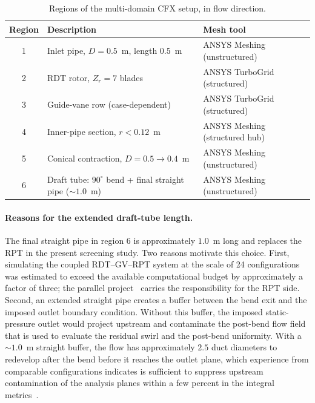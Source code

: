 \begin{table}[h!]
  \centering
  \caption[Domain regions]{Regions of the multi-domain CFX setup, in flow direction.}
  \label{tab:domains}
  \small
  \begin{tabular}{c|l|l}
    \toprule
    \textbf{Region} & \textbf{Description} & \textbf{Mesh tool} \\
    \midrule
    1 & Inlet pipe, $D = 0.5$~m, length $0.5$~m   & ANSYS Meshing (unstructured) \\
    2 & RDT rotor, $Z_r = 7$ blades              & ANSYS TurboGrid (structured) \\
    3 & Guide-vane row (case-dependent)          & ANSYS TurboGrid (structured) \\
    4 & Inner-pipe section, $r < 0.12$~m         & ANSYS Meshing (structured hub) \\
    5 & Conical contraction, $D = 0.5 \to 0.4$~m & ANSYS Meshing (unstructured) \\
    6 & Draft tube: $90^\circ$ bend + final straight pipe ($\sim 1.0$~m) & ANSYS Meshing (unstructured) \\
    \bottomrule
  \end{tabular}
\end{table}
 
\paragraph{Reasons for the extended draft-tube length.}
The final straight pipe in region 6 is approximately $1.0$~m long and replaces the RPT in the present screening study. Two reasons motivate this choice. First, simulating the coupled RDT--GV--RPT system at the scale of 24 configurations was estimated to exceed the available computational budget by approximately a factor of three; the parallel project~\cite{Dokset2025} carries the responsibility for the RPT side. Second, an extended straight pipe creates a buffer between the bend exit and the imposed outlet boundary condition. Without this buffer, the imposed static-pressure outlet would project upstream and contaminate the post-bend flow field that is used to evaluate the residual swirl and the post-bend uniformity. With a $\sim 1.0$~m straight buffer, the flow has approximately $2.5$ duct diameters to redevelop after the bend before it reaches the outlet plane, which experience from comparable configurations indicates is sufficient to suppress upstream contamination of the analysis planes within a few percent in the integral metrics~\cite{Xia1997}.
 
